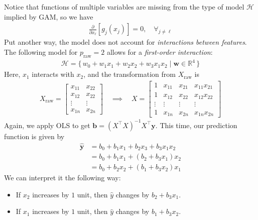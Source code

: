 \documentclass[12pt, a4paper]{article}
\theoremstyle{definition}
\begin{document}
	Notice that functions of multiple variables are missing from the type of
	model $\mathcal{H}$ implied by GAM, so we have
	\begin{align*}
		\frac{\partial}{\partial x_\ell} [g_j(x_j)] = 0,\quad \forall_{j\neq \ell}
	\end{align*}
	Put another way, the model does not account for \textit{interactions between features}.
	The following model for $p_{\text{raw}}=2$ allows for a \textit{first-order interaction}:
	\begin{align*}
		\mathcal{H} = \{\,
		w_0 + w_1x_1 + w_2x_2 + w_3x_1x_2 \mid \bm{w}\in \mathbb{R}^4
		\,\}
	\end{align*}
	Here, $x_1$ interacts with $x_2$, and the transformation from $X_\text{raw}$ is
	\begin{align*}
		X_\text{raw} = \begin{bmatrix}
			x_{11} & x_{22}\\
			x_{12} & x_{22}\\
			\vdots & \vdots\\
			x_{1n} & x_{2n}
		\end{bmatrix}
		\quad
		\implies
		\quad
		X = \begin{bmatrix}
			1 & x_{11} & x_{21} & x_{11} x_{21}\\
			1 & x_{12} & x_{22} & x_{12} x_{22}\\
			\vdots & \vdots & \vdots & \vdots\\
			1 & x_{1n} & x_{2n} & x_{1n}x_{2n}
		\end{bmatrix}
	\end{align*}
	Again, we apply OLS to get $\bm{b} = (X^\top X)^{-1}X^\top \bm{y}$.
	This time, our prediction function is given by
	\begin{align*}
		\hat{\bm{y}}
		&= b_0 + b_1x_1 + b_2x_3 + b_3x_1x_2\\
		&= b_0 + b_1x_1 + (b_2 + b_3x_1)x_2\\
		&= b_0 + b_2x_2 + (b_1 + b_3x_2)x_1
	\end{align*}
	We can interpret it the following way:
	\begin{itemize}
		\item If $x_2$ increases by $1$ unit, then $\hat{y}$ changes by $b_2+b_3x_1$.
		\item If $x_1$ increases by $1$ unit, then $\hat{y}$ changes by $b_1+b_3x_2$.
	\end{itemize}
	\pagebreak
	\printbibliography
\end{document}
